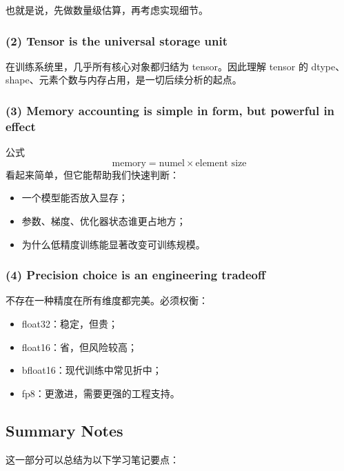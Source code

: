 \documentclass[a4paper,UTF8]{article}
\numberwithin{equation}{section}
\begin{document}
也就是说，先做数量级估算，再考虑实现细节。

\subsubsection{(2) Tensor is the universal storage unit}

在训练系统里，几乎所有核心对象都归结为 tensor。因此理解 tensor 的 dtype、shape、元素个数与内存占用，是一切后续分析的起点。

\subsubsection{(3) Memory accounting is simple in form, but powerful in effect}

公式
\[
\text{memory} = \text{numel} \times \text{element size}
\]
看起来简单，但它能帮助我们快速判断：
\begin{itemize}
    \item 一个模型能否放入显存；
    \item 参数、梯度、优化器状态谁更占地方；
    \item 为什么低精度训练能显著改变可训练规模。
\end{itemize}

\subsubsection{(4) Precision choice is an engineering tradeoff}

不存在一种精度在所有维度都完美。必须权衡：
\begin{itemize}
    \item float32：稳定，但贵；
    \item float16：省，但风险较高；
    \item bfloat16：现代训练中常见折中；
    \item fp8：更激进，需要更强的工程支持。
\end{itemize}

\subsection{Summary Notes}

这一部分可以总结为以下学习笔记要点：
\end{document}

